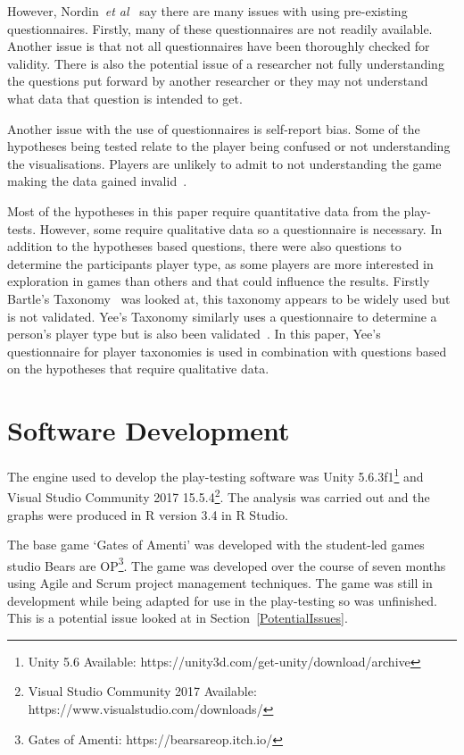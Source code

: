 \documentclass[journal]{IEEEtran}
\begin{document}
	However, Nordin~\textit{et al}~\cite{nordin2014} say there are many issues with using pre-existing questionnaires. Firstly, many of these questionnaires are not readily available. Another issue is that not all questionnaires have been thoroughly checked for validity. There is also the potential issue of a researcher not fully understanding the questions put forward by another researcher or they may not understand what data that question is intended to get.
	
	Another issue with the use of questionnaires is self-report bias. Some of the hypotheses being tested relate to the player being confused or not understanding the visualisations. Players are unlikely to admit to not understanding the game making the data gained invalid~\cite{donaldson2002}.
	
	Most of the hypotheses in this paper require quantitative data from the play-tests. However, some require qualitative data so a questionnaire is necessary.  In addition to the hypotheses based questions, there were also questions to determine the participants player type, as some players are more interested in exploration in games than others and that could influence the results. 
	Firstly Bartle's Taxonomy~\cite{Bartle1996} was looked at, this taxonomy appears to be widely used but is not validated. Yee's Taxonomy similarly uses a questionnaire to determine a person's player type but is also been validated~\cite{Yee2012, Yee2006}.  In this paper, Yee's questionnaire for player taxonomies is used in combination with questions based on the hypotheses that require qualitative data. 
	
	\section{Software Development} \label{softdev}
	The engine used to develop the play-testing software was Unity 5.6.3f1\footnote[3]{Unity 5.6 Available: https://unity3d.com/get-unity/download/archive} and Visual Studio Community 2017  15.5.4\footnote[4]{Visual Studio Community 2017 Available: https://www.visualstudio.com/downloads/}.  The analysis was carried out and the graphs were produced in R version 3.4 in R Studio.
	
	The base game `Gates of Amenti' was developed with the student-led games studio Bears are OP\footnote[5]{Gates of Amenti: https://bearsareop.itch.io/}. The game was developed over the course of seven months using Agile and Scrum project management techniques. The game was still in development while being adapted for use in the play-testing so was unfinished. This is a potential issue looked at in Section~\ref{PotentialIssues}. 
	
\end{document}
